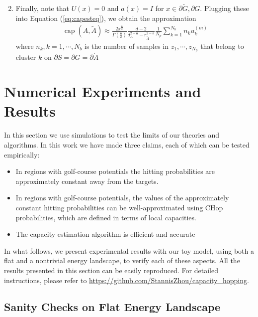 \documentclass[english, aip, jcp, priprint, graphicx,floatfix]{revtex4-1}
\theoremstyle{plain}
\theoremstyle{definition}
\theoremstyle{plain}
\newcommand{\dimension}{{\mathfrak{n}}}
\begin{document}
\begin{enumerate}
\[\]
\item Finally, note that $U (x) = 0$ and $a (x) = I$ for $x
\in \partial \tilde{G},\partial G$.  Plugging these into Equation (\ref{eq:capesteq}), we obtain the approximation
%
\begin{gather}
	\ensuremath{\operatorname{cap}} (A, \tilde{A}) \approx \frac{2\pi^{\frac{\dimension}{2}}}{\Gamma(\frac{\dimension}{2})}\frac{d-2}{d_A^{2-\dimension}-r_{\tilde A}^{2-\dimension}}\frac{1}{N_p} \sum_{k=1}^{N_b}n_k u_k^{(m)}
\end{gather}
where $n_k, k=1, \cdots, N_b$ is the number of samples in $z_1, \cdots, z_{N_p}$ that belong to cluster $k$ on $\partial S=\partial G=\partial \dot{A}$
%
\end{enumerate}


                                     


\section{Numerical Experiments and Results}\label{sec:experiments}
In this section we use simulations to test the limits of our theories and algorithms.  In this work we have made three claims, each of which can be tested empirically:

\begin{itemize}
\item In regions with golf-course potentials the hitting probabilities are approximately constant away from the targets.
\item In regions with golf-course potentials, the values of the approximately constant hitting probabilities can be well-approximated using CHop probabilities, which are defined in terms of local capacities.
\item The capacity estimation algorithm is efficient and accurate
\end{itemize}

In what follows, we present experimental results with our toy model, using both a flat and a nontrivial energy landscape, to verify each of these aspects.  All the results presented in this section can be easily reproduced. For detailed instructions, please refer to \url{https://github.com/StannisZhou/capacity_hopping}.

\subsection{Sanity Checks on Flat Energy Landscape}
\end{document}
